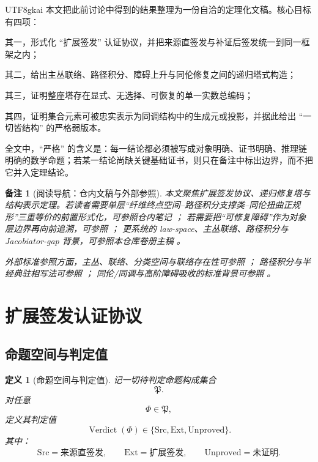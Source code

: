 \documentclass[12pt]{article}
\newtheorem{definition}{定义}[section]
\newtheorem{remark}{备注}[section]
\newcommand{\Src}{\mathrm{Src}}
\newcommand{\Ext}{\mathrm{Ext}}
\newcommand{\Unproved}{\mathrm{Unproved}}
\newcommand{\Verdict}{\operatorname{Verdict}}
\begin{document}
\begin{CJK*}{UTF8}{gkai}
本文把此前讨论中得到的结果整理为一份自洽的定理化文稿。核心目标有四项：

其一，形式化 ``扩展签发'' 认证协议，并把来源直签发与补证后签发统一到同一框架之内；

其二，给出主丛联络、路径积分、障碍上升与同伦修复之间的递归塔式构造；

其三，证明整座塔存在显式、无选择、可恢复的单一实数总编码；

其四，证明集合元素可被忠实表示为同调结构中的生成元或投影，并据此给出 ``一切皆结构'' 的严格弱版本。

全文中，``严格'' 的含义是：每一结论都必须被写成对象明确、证书明确、推理链明确的数学命题；若某一结论尚缺关键基础证书，则只在备注中标出边界，而不把它并入定理结论。

\begin{remark}[阅读导航：仓内文稿与外部参照]
本文聚焦扩展签发协议、递归修复塔与结构表示定理。若读者需要单层“纤维终点空间--路径积分支撑类--同伦扭曲正规形”三重等价的前置形式化，可参照仓内笔记 \cite{RepoTex36Formal}；
若需要把“可修复障碍”作为对象层边界再向前追溯，可参照 \cite{RepoTex29RepairableObstruction}；
更系统的 law-space、主丛联络、路径积分与 Jacobiator-gap 背景，可参照本仓库卷册主稿 \cite{GaoZhengAppVol3}。

外部标准参照方面，主丛、联络、分类空间与联络存在性可参照 \cite{KobayashiNomizu1963Foundations,Husemoller1994FibreBundles}；
路径积分与半经典驻相写法可参照 \cite{FeynmanHibbs1965QMPI,Schulman2005Technique}；
同伦/同调与高阶障碍吸收的标准背景可参照 \cite{Hatcher2002AT,Whitehead1978Elements,Weibel1994HomologicalAlgebra,
  LodayVallette2012AlgebraicOperads}。
\end{remark}

\section{扩展签发认证协议}
\label{sec:tex35-protocol}

\subsection{命题空间与判定值}

\begin{definition}[命题空间与判定值]
记一切待判定命题构成集合
\[
\mathfrak P.
\]
对任意
\[
\Phi\in\mathfrak P,
\]
定义其判定值
\[
\Verdict(\Phi)\in\{\Src,\Ext,\Unproved\}.
\]
其中：
\[
\Src=\text{来源直签发},\qquad
\Ext=\text{扩展签发},\qquad
\Unproved=\text{未证明}.
\]
\end{definition}


\end{CJK*}
\end{document}

